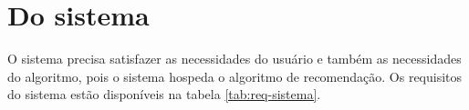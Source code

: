 

\section{Do sistema}

O sistema precisa satisfazer as necessidades do usuário e também as necessidades do algoritmo, pois o sistema hospeda o algoritmo de recomendação.
Os requisitos do sistema estão disponíveis na tabela \ref{tab:req-sistema}.

